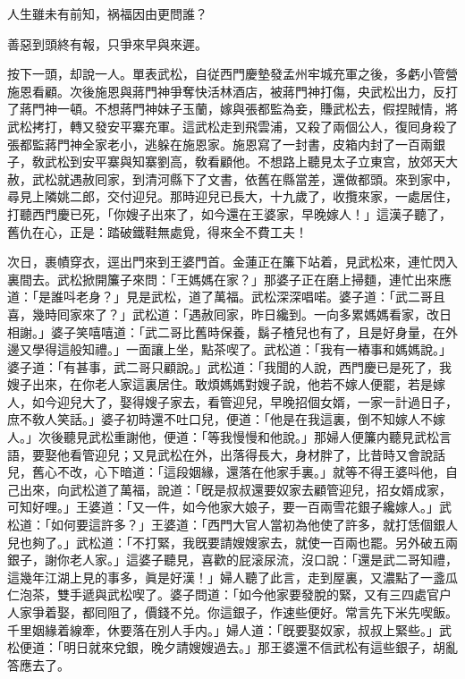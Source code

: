 \begin{myquote}
人生雖未有前知，祸福因由更問誰？

善惡到頭終有報，只爭來早與來遲。
\end{myquote}

按下一頭，却說一人。單表武松，自従西門慶墊發孟州牢城充軍之後，多虧小管營施恩看顧。次後施恩與蔣門神爭奪快活林酒店，被蔣門神打傷，央武松出力，反打了蔣門神一頓。不想蔣門神妹子玉蘭，嫁與張都監為妾，賺武松去，假捏賊情，將武松拷打，轉又發安平寨充軍。這武松走到飛雲浦，又殺了兩個公人，復囘身殺了張都監蔣門神全家老小，逃躲在施恩家。施恩寫了一封書，皮箱内封了一百兩銀子，敎武松到安平寨與知寨劉高，敎看顧他。不想路上聽見太子立東宫，放郊天大赦，武松就遇赦囘家，到清河縣下了文書，依舊在縣當差，還做都頭。來到家中，尋見上隣姚二郎，交付迎兒。那時迎兒已長大，十九歲了，收攬來家，一處居住，打聽西門慶已死，「你嫂子出來了，如今還在王婆家，早晚嫁人！」這漢子聽了，舊仇在心，正是：踏破鐵鞋無處覓，得來全不費工夫！

次日，裹幘穿衣，逕出門來到王婆門首。金蓮正在簾下站着，見武松來，連忙閃入裏間去。武松掀開簾子來問：「王媽媽在家？」那婆子正在磨上掃麵，連忙出來應道：「是誰呌老身？」見是武松，道了萬福。武松深深唱喏。婆子道：「武二哥且喜，幾時囘家來了？」武松道：「遇赦囘家，昨日纔到。一向多累媽媽看家，改日相謝。」婆子笑嘻嘻道：「武二哥比舊時保養，鬍子楂兒也有了，且是好身量，在外邊又學得這般知禮。」一面讓上坐，點茶喫了。武松道：「我有一樁事和媽媽說。」婆子道：「有甚事，武二哥只顧說。」武松道：「我聞的人說，西門慶已是死了，我嫂子出來，在你老人家這裏居住。敢煩媽媽對嫂子說，他若不嫁人便罷，若是嫁人，如今迎兒大了，娶得嫂子家去，看管迎兒，早晚招個女婿，一家一計過日子，庶不敎人笑話。」婆子初時還不吐口兒，便道：「他是在我這裏，倒不知嫁人不嫁人。」次後聽見武松重謝他，便道：「等我慢慢和他說。」那婦人便簾内聽見武松言語，要娶他看管迎兒；又見武松在外，出落得長大，身材胖了，比昔時又會說話兒，舊心不改，心下暗道：「這段姻緣，還落在他家手裏。」就等不得王婆呌他，自己出來，向武松道了萬福，說道：「旣是叔叔還要奴家去顧管迎兒，招女婿成家，可知好哩。」王婆道：「又一件，如今他家大娘子，要一百兩雪花銀子纔嫁人。」武松道：「如何要這許多？」王婆道：「西門大官人當初為他使了許多，就打恁個銀人兒也夠了。」武松道：「不打緊，我旣要請嫂嫂家去，就使一百兩也罷。另外破五兩銀子，謝你老人家。」這婆子聽見，喜歡的屁滚尿流，沒口說：「還是武二哥知禮，這幾年江湖上見的事多，眞是好漢！」婦人聽了此言，走到屋裏，又濃點了一盞瓜仁泡茶，雙手遞與武松喫了。婆子問道：「如今他家要發脫的緊，又有三四處官户人家爭着娶，都囘阻了，價錢不兑。你這銀子，作速些便好。常言先下米先喫飯。千里姻緣着線牽，休要落在別人手内。」婦人道：「旣要娶奴家，叔叔上緊些。」武松便道：「明日就來兌銀，晚夕請嫂嫂過去。」那王婆還不信武松有這些銀子，胡亂答應去了。

